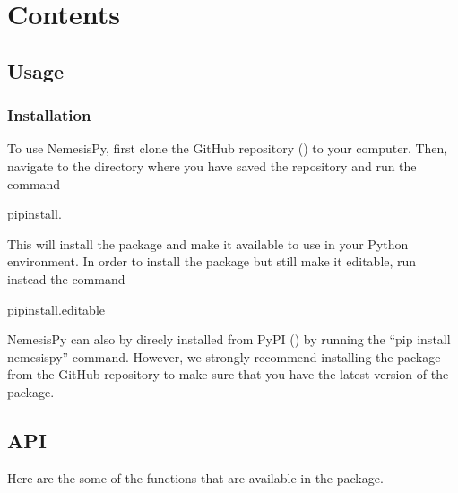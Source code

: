 \documentclass[letterpaper,10pt,english]{sphinxmanual}
\begin{document}
\chapter{Contents}
\label{\detokenize{index:contents}}
\sphinxstepscope


\section{Usage}
\label{\detokenize{usage:usage}}\label{\detokenize{usage::doc}}

\subsection{Installation}
\label{\detokenize{usage:installation}}
\sphinxAtStartPar
To use NemesisPy, first clone the GitHub repository ()
to your computer. Then, navigate to the directory where you have saved the
repository and run the command

\begin{sphinxVerbatim}[commandchars=\\\{\}]
pipinstall.
\end{sphinxVerbatim}

\sphinxAtStartPar
This will install the package and make it available to use in your Python environment.
In order to install the package but still make it editable, run instead the command

\begin{sphinxVerbatim}[commandchars=\\\{\}]
pipinstall.\PYGZhy{}\PYGZhy{}editable
\end{sphinxVerbatim}

\sphinxAtStartPar
NemesisPy can also by direcly installed from PyPI
() by running the “pip install nemesispy” command.
However, we strongly recommend installing the package from the GitHub repository
to make sure that you have the latest version of the package.

\sphinxstepscope


\section{API}
\label{\detokenize{api:api}}\label{\detokenize{api::doc}}
\sphinxAtStartPar
Here are the some of the functions that are available in the  package.
\end{document}

